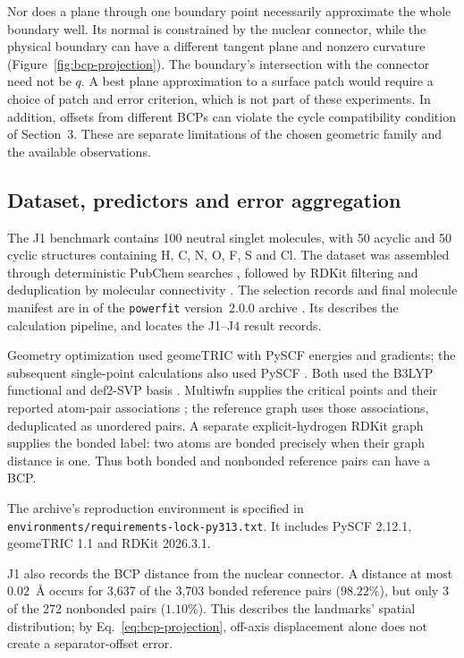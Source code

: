 Nor does a plane through one boundary point necessarily approximate the whole boundary well. Its normal is constrained by the nuclear connector, while the physical boundary can have a different tangent plane and nonzero curvature (Figure~\ref{fig:bcp-projection}). The boundary's intersection with the connector need not be $q$. A best plane approximation to a surface patch would require a choice of patch and error criterion, which is not part of these experiments. In addition, offsets from different BCPs can violate the cycle compatibility condition of Section~3. These are separate limitations of the chosen geometric family and the available observations.

\subsection{Dataset, predictors and error aggregation}
\label{app:molecular-protocols}

The J1 benchmark contains 100 neutral singlet molecules, with 50 acyclic and 50 cyclic structures containing H, C, N, O, F, S and Cl. The dataset was assembled through deterministic PubChem searches \citep{PubChem2025}, followed by RDKit filtering and deduplication by molecular connectivity \citep{RDKit2026}. The selection records and final molecule manifest are in  of the \texttt{powerfit} version~2.0.0 archive \citep{PowerfitArchive2026}. Its  describes the calculation pipeline, and  locates the J1--J4 result records.

Geometry optimization used geomeTRIC \citep{WangSong2016} with PySCF energies and gradients; the subsequent single-point calculations also used PySCF \citep{Sun2020}. Both used the B3LYP functional \citep{Becke1993,Stephens1994} and def2-SVP basis \citep{WeigendAhlrichs2005}. Multiwfn supplies the critical points and their reported atom-pair associations \citep{LuChen2012,Lu2024Multiwfn}; the reference graph uses those associations, deduplicated as unordered pairs. A separate explicit-hydrogen RDKit graph supplies the bonded label: two atoms are bonded precisely when their graph distance is one. Thus both bonded and nonbonded reference pairs can have a BCP.

The archive's reproduction environment is specified in
\texttt{environments/\allowbreak requirements-lock-py313.txt}.
It includes PySCF 2.12.1, geomeTRIC 1.1 and RDKit 2026.3.1.

J1 also records the BCP distance from the nuclear connector. A distance at most $0.02$~\AA{} occurs for 3,637 of the 3,703 bonded reference pairs ($98.22\%$), but only 3 of the 272 nonbonded pairs ($1.10\%$). This describes the landmarks' spatial distribution; by Eq.~\eqref{eq:bcp-projection}, off-axis displacement alone does not create a separator-offset error.

